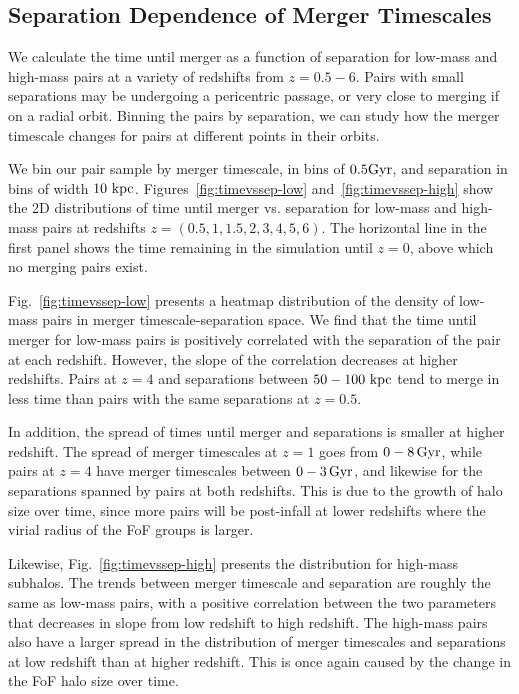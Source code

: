 \documentclass[twocolumn,linenumbers]{aastex631}
\begin{document}
\subsection{Separation Dependence of Merger Timescales}\label{sec:results-timevsep}
We calculate the time until merger as a function of separation for low-mass and high-mass pairs at a variety of redshifts from $z=0.5-6$. 
Pairs with small separations may be undergoing a pericentric passage, or very close to merging if on a radial orbit.
Binning the pairs by separation, we can study how the merger timescale changes for pairs at different points in their orbits. 

We bin our pair sample by merger timescale, in bins of $0.5\mathrm{Gyr}$, and separation in bins of width $10\,\mathrm{\,kpc}$.
Figures~\ref{fig:timevssep-low} and~\ref{fig:timevssep-high} show the 2D distributions of time until merger vs. separation for low-mass and high-mass pairs at redshifts $z=(0.5,1,1.5,2,3,4,5,6)$. 
The horizontal line in the first panel shows the time remaining in the simulation until $z=0$, above which no merging pairs exist.

Fig.~\ref{fig:timevssep-low} presents a heatmap distribution of the density of low-mass pairs in merger timescale-separation space. 
We find that the time until merger for low-mass pairs is positively correlated with the separation of the pair at each redshift. 
However, the slope of the correlation decreases at higher redshifts.
Pairs at $z=4$ and separations between $50-100\,\mathrm{\,kpc}$ tend to merge in less time than pairs with the same separations at $z=0.5$. 

In addition, the spread of times until merger and separations is smaller at higher redshift. 
The spread of merger timescales at $z=1$ goes from $0-8\,\mathrm{Gyr}$, while pairs at $z=4$ have merger timescales between $0-3\,\mathrm{Gyr}$, and likewise for the separations spanned by pairs at both redshifts. 
This is due to the growth of halo size over time, since more pairs will be post-infall at lower redshifts where the virial radius of the FoF groups is larger. 

Likewise, Fig.~\ref{fig:timevssep-high} presents the distribution for high-mass subhalos.
The trends between merger timescale and separation are roughly the same as low-mass pairs, with a positive correlation between the two parameters that decreases in slope from low redshift to high redshift. 
The high-mass pairs also have a larger spread in the distribution of merger timescales and separations at low redshift than at higher redshift.
This is once again caused by the change in the FoF halo size over time. 
\end{document}
